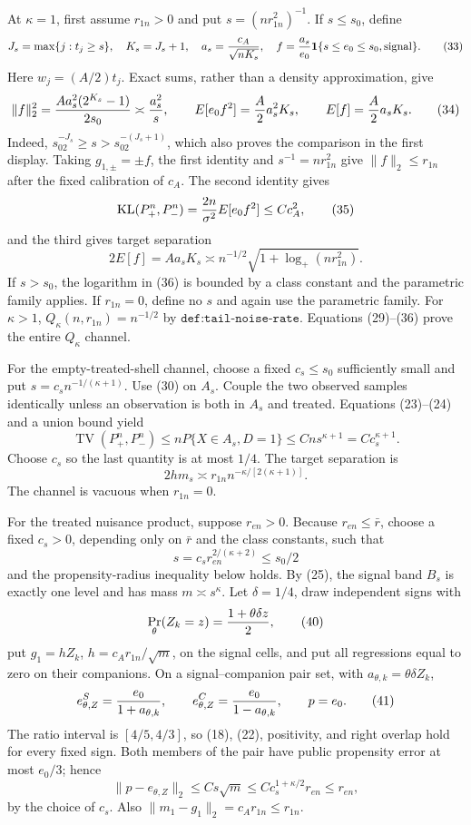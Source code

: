 At \(\kappa=1\), first assume \(r_{1n}>0\) and put \(s=(nr_{1n}^2)^{-1}\).  If \(s\leq s_0\), define
\[
J_s=\max\{j:t_j\geq s\},\quad K_s=J_s+1,\quad
a_s={c_A\over\sqrt{nK_s}},\quad
f={a_s\over e_0}\mathbf 1\{s\leq e_0\leq s_0,\mathrm{signal}\}.       \tag{33}
\]
Here \(w_j=(A/2)t_j\).  Exact sums, rather than a density approximation, give
\[
\|f\|_2^2={Aa_s^2(2^{K_s}-1)\over2s_0}\asymp {a_s^2\over s},\qquad
E[e_0f^2]={A\over2}a_s^2K_s,\qquad
E[f]={A\over2}a_sK_s.                                                    \tag{34}
\]
Indeed, \(s_02^{-J_s}\geq s>s_02^{-(J_s+1)}\), which also proves the comparison in the first display.  Taking \(g_{1,\pm}=\pm f\), the first identity and \(s^{-1}=nr_{1n}^2\) give \(\|f\|_2\leq r_{1n}\) after the fixed calibration of \(c_A\).  The second identity gives
\[
\operatorname{KL}(P_+^n,P_-^n)
={2n\over\sigma^2}E[e_0f^2]\leq Cc_A^2,                                  \tag{35}
\]
and the third gives target separation
\[
2E[f]=Aa_sK_s\asymp n^{-1/2}\sqrt{1+\log_+(nr_{1n}^2)}.                  \tag{36}
\]
If \(s>s_0\), the logarithm in (36) is bounded by a class constant and the parametric family applies.  If \(r_{1n}=0\), define no \(s\) and again use the parametric family.  For \(\kappa>1\), \(Q_\kappa(n,r_{1n})=n^{-1/2}\) by \(\texttt{def:tail-noise-rate}\).  Equations (29)--(36) prove the entire \(Q_\kappa\) channel.

For the empty-treated-shell channel, choose a fixed \(c_s\leq s_0\) sufficiently small and put \(s=c_sn^{-1/(\kappa+1)}\).  Use (30) on \(A_s\).  Couple the two observed samples identically unless an observation is both in \(A_s\) and treated.  Equations (23)--(24) and a union bound yield
\[
\operatorname{TV}(P_+^n,P_-^n)
\leq nP\{X\in A_s,D=1\}
\leq Cns^{\kappa+1}=Cc_s^{\kappa+1}.                                    \tag{37}
\]
Choose \(c_s\) so the last quantity is at most \(1/4\).  The target separation is
\[
2hm_s\asymp r_{1n}n^{-\kappa/[2(\kappa+1)]}.                             \tag{38}
\]
The channel is vacuous when \(r_{1n}=0\).

For the treated nuisance product, suppose \(r_{en}>0\).  Because \(r_{en}\leq\bar r\), choose a fixed \(c_s>0\), depending only on \(\bar r\) and the class constants, such that
\[
s=c_sr_{en}^{2/(\kappa+2)}\leq s_0/2                                      \tag{39}
\]
and the propensity-radius inequality below holds.  By (25), the signal band \(B_s\) is exactly one level and has mass \(m\asymp s^\kappa\).  Let \(\delta=1/4\), draw independent signs with
\[
\Pr_\theta(Z_k=z)={1+\theta\delta z\over2},                             \tag{40}
\]
put \(g_1=hZ_k\), \(h=c_A r_{1n}/\sqrt m\), on the signal cells, and put all regressions equal to zero on their companions.  On a signal--companion pair set, with \(a_{\theta,k}=\theta\delta Z_k\),
\[
e^S_{\theta,Z}={e_0\over1+a_{\theta,k}},\qquad
e^C_{\theta,Z}={e_0\over1-a_{\theta,k}},\qquad p=e_0.                   \tag{41}
\]
The ratio interval is \([4/5,4/3]\), so (18), (22), positivity, and right overlap hold for every fixed sign.  Both members of the pair have public propensity error at most \(e_0/3\); hence
\[
\|p-e_{\theta,Z}\|_2\leq Cs\sqrt m
\leq Cc_s^{1+\kappa/2}r_{en}\leq r_{en},                                \tag{42}
\]
by the choice of \(c_s\).  Also \(\|m_1-g_1\|_2=c_A r_{1n}\leq r_{1n}\).


